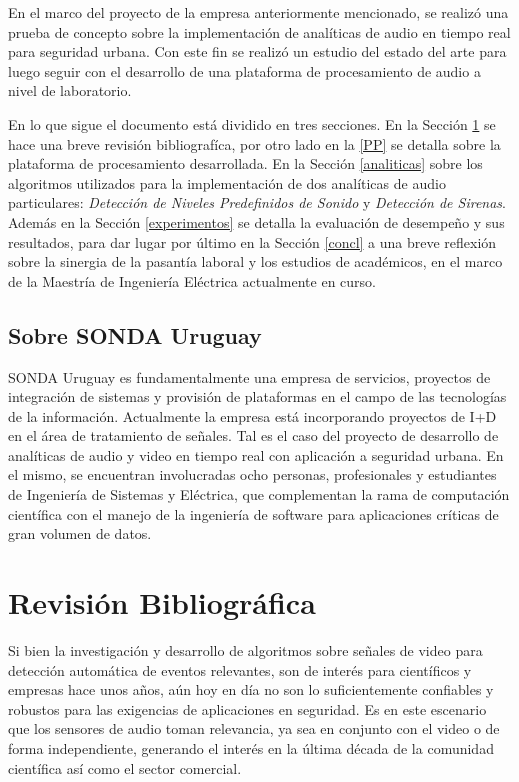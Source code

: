 \documentclass{article}
\begin{document}
\bigskip
En el marco del proyecto de la empresa anteriormente mencionado, se realizó una prueba de concepto sobre la implementación de analíticas de audio en tiempo real para seguridad urbana. Con este fin se realizó un estudio del estado del arte para luego seguir con el desarrollo de una plataforma de procesamiento de audio a nivel de laboratorio. 

\bigskip
En lo que sigue el documento está dividido en tres secciones. En la Sección \ref{literatura} se hace una breve revisión bibliografíca, por otro lado en la \ref{PP} se detalla sobre la plataforma de procesamiento desarrollada. En la Sección \ref{analiticas} sobre los algoritmos utilizados para la implementación de dos analíticas de audio particulares: \textit{Detección de Niveles Predefinidos de Sonido} y \textit{Detección de Sirenas}. Además en la Sección \ref{experimentos} se detalla la evaluación de desempeño y sus resultados, para dar lugar por último en la Sección \ref{concl} a una breve reflexión sobre la sinergia de la pasantía laboral y los estudios de académicos, en el marco de la Maestría de Ingeniería Eléctrica actualmente en curso.  

\subsection{Sobre SONDA Uruguay}
SONDA Uruguay es fundamentalmente una empresa de servicios, proyectos de integración de sistemas y provisión de plataformas en el campo de las tecnologías de la información. Actualmente la empresa está incorporando proyectos de I+D en el área de tratamiento de señales. Tal es el caso del proyecto de desarrollo de analíticas de audio y video en tiempo real con aplicación a seguridad urbana. En el mismo, se encuentran involucradas ocho personas, profesionales y estudiantes de Ingeniería de Sistemas y Eléctrica, que complementan la rama de computación científica con el manejo de la ingeniería de software para aplicaciones críticas de gran volumen de datos.  


\section{Revisión Bibliográfica}
\label{literatura}
Si bien la investigación y desarrollo de algoritmos sobre señales de video para detección automática de eventos relevantes, son de interés para científicos y empresas hace unos años, aún hoy en día no son lo suficientemente confiables y robustos para las exigencias de aplicaciones en seguridad. Es en este escenario que los sensores de audio toman relevancia, ya sea en conjunto con el video o de forma independiente, generando el interés en la última década de la comunidad científica así como el sector comercial. 
\end{document}
